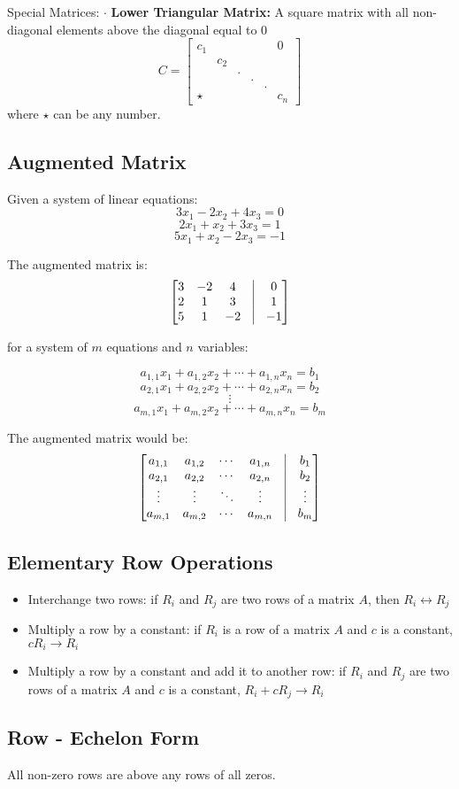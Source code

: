 \documentclass{article}
\begin{document}
\begin{paragraph}{Special Matrices:}
    $\cdot$ \textbf{Lower Triangular Matrix:} A square matrix with all non-diagonal elements above the diagonal equal to 0
        $$ C = \begin{bmatrix}
            c_1 &&&&& 0 \\
            &c_2&&&&\\
            &&.&&&\\
            &&&.&&\\
            &&&&.&\\
            \star&&&&&c_n
        \end{bmatrix}$$
        where $\star$ can be any number.
\end{paragraph}

\subsection*{Augmented Matrix}
Given a system of linear equations:
    $$
    3x_1 - 2x_2 + 4x_3 = 0
    $$
    $$
    2x_1 + x_2 + 3x_3 = 1
    $$
    $$
    5x_1 + x_2 - 2x_3 = -1
    $$
    
The augmented matrix is:
$$
\begin{bmatrix}
    3 & -2 & 4 & \vline & 0 \\
    2 & 1 & 3 & \vline & 1 \\
    5 & 1 & -2 & \vline & -1 
\end{bmatrix}
$$    

for a system of $m$ equations and $n$ variables:

    $$
    a_{1,1} x_1 + a_{1,2} x_2 + \cdots + a_{1,n} x_n = b_1
    $$
    $$
    a_{2,1} x_1 + a_{2,2} x_2 + \cdots + a_{2,n} x_n = b_2
    $$
    $$
    \vdots
    $$
    $$
    a_{m,1} x_1 + a_{m,2} x_2 + \cdots + a_{m,n} x_n = b_m
    $$

The augmented matrix would be:
$$
\begin{bmatrix}
    a_{1,1} & a_{1,2} & \cdots & a_{1,n} & \vline & b_1 \\
    a_{2,1} & a_{2,2} & \cdots & a_{2,n} & \vline & b_2 \\
    \vdots & \vdots & \ddots & \vdots & \vline & \vdots \\
    a_{m,1} & a_{m,2} & \cdots & a_{m,n} & \vline & b_m
\end{bmatrix}
$$

\subsection*{Elementary Row Operations}
\begin{itemize}
    \item Interchange two rows: if $R_i$ and $R_j$ are two rows of a matrix $A$, then $R_i \leftrightarrow R_j$ 
    \item Multiply a row by a constant: if $R_i$ is a row of a matrix $A$ and $c$ is a constant, $cR_i \rightarrow R_i$
    \item Multiply a row by a constant and add it to another row: if $R_i$ and $R_j$ are two rows of a matrix $A$ and $c$ is a constant, $R_i + cR_j \rightarrow R_i$
\end{itemize}

\subsection*{Row - Echelon Form}
All non-zero rows are above any rows of all zeros.\\[1pt]
\end{document}
